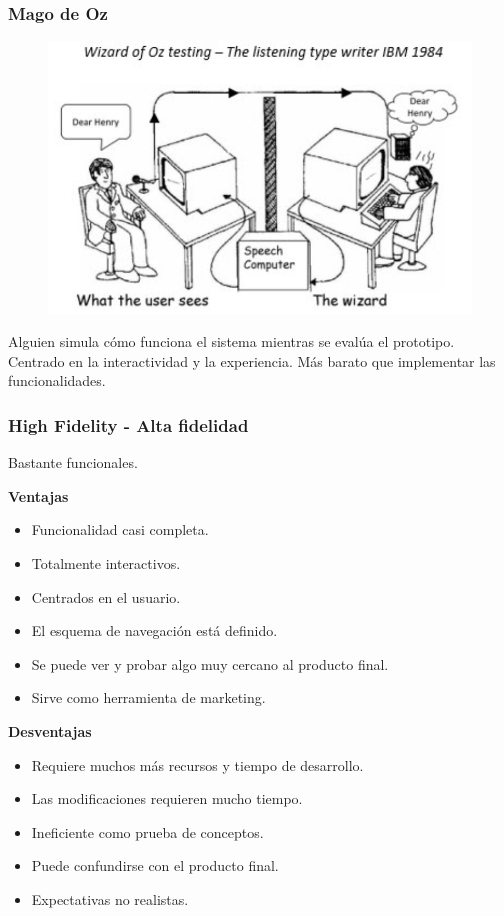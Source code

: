 \documentclass[12pt, twoside, openright]{report} %
\begin{document}
\subsubsection{Mago de Oz}

\begin{figure}[H]
	{\includegraphics[scale=.4]{2021-03-20 23_48_56-L5.pdf - Foxit Reader.png}}
\end{figure}

Alguien simula cómo funciona el sistema mientras se evalúa el prototipo. Centrado en la interactividad y la experiencia. Más barato que implementar las funcionalidades.

\subsubsection{High Fidelity - Alta fidelidad}
Bastante funcionales.

\textbf{Ventajas}
\begin{itemize}
	\item Funcionalidad casi completa.
	\item Totalmente interactivos.
	\item Centrados en el usuario.
	\item El esquema de navegación está definido.
	\item Se puede ver y probar algo muy cercano al producto final.
	\item Sirve como herramienta de marketing.
\end{itemize}

\textbf{Desventajas}
\begin{itemize}
	\item Requiere muchos más recursos y tiempo de desarrollo.
	\item Las modificaciones requieren mucho tiempo.
	\item Ineficiente como prueba de conceptos.
	\item Puede confundirse con el producto final.
	\item Expectativas no realistas.
\end{itemize}
\end{document}
